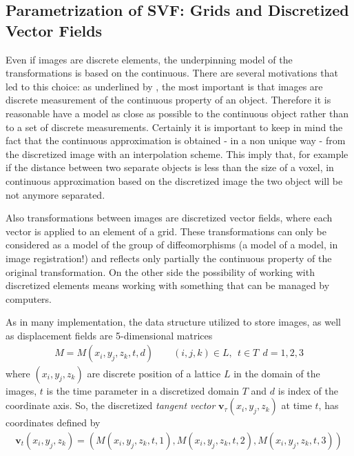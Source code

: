 \subsection{Parametrization of SVF: Grids and Discretized Vector Fields}\label{se:parametrization_SVF}

Even if images are discrete elements, the underpinning model of the transformations is based on the continuous. There are several motivations that led to this choice: as underlined by \cite{szeliski1994image}, the most important is that images are discrete measurement of the continuous property of an object. Therefore it is reasonable have a model as close as possible to the continuous object rather than to a set of discrete measurements. 
Certainly it is important to keep in mind the fact that the continuous approximation is obtained - in a non unique way - from the discretized image with an interpolation scheme. This imply that, for example if the distance between two separate objects is less than the size of a voxel, in continuous approximation based on the discretized image the two object will be not anymore separated. 

Also transformations between images are discretized vector fields, where each vector is applied to an element of a grid. These transformations can only be considered as a model of the group of diffeomorphisms (a model of a model, in image registration!) and reflects only partially the continuous property of the original transformation.
On the other side the possibility of working with discretized elements means working with something that can be managed by computers.

As in many implementation, the data structure utilized to store images, as well as displacement fields are 5-dimensional matrices
\begin{align}\label{eq:basic_data_structure}
M = M(x_i,y_j,z_k,t,d) \qquad (i,j,k)\in L , ~~ t \in T  ~~ d = 1,2,3
\end{align}
where $(x_i,y_j,z_k)$ are discrete position of a lattice $L$ in the domain of the images, $t$ is the time parameter in a discretized domain $T$ and $d$ is index of the coordinate axis. So, the discretized \emph{tangent vector} $\mathbf{v}_{\tau}(x_i,y_j,z_k)$ at time $t$, has coordinates defined by
\begin{align*}
\mathbf{v}_{t}(x_i,y_j,z_k) = (M(x_i,y_j,z_k,t ,1), M(x_i,y_j,z_k,t,2), M(x_i,y_j,z_k,t ,3))
\end{align*}


